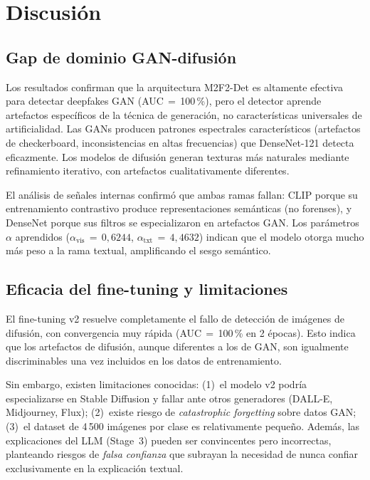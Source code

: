 \documentclass[pdflatex,sn-mathphys-num]{sn-jnl}
\begin{document}
\section{Discusión}\label{sec:discussion}

\subsection{Gap de dominio GAN-difusión}

Los resultados confirman que la arquitectura M2F2-Det es altamente efectiva para detectar deepfakes GAN (AUC$\,=\,$100\,\%), pero el detector aprende artefactos específicos de la técnica de generación, no características universales de artificialidad. Las GANs producen patrones espectrales característicos (artefactos de checkerboard, inconsistencias en altas frecuencias) que DenseNet-121 detecta eficazmente. Los modelos de difusión generan texturas más naturales mediante refinamiento iterativo, con artefactos cualitativamente diferentes.

El análisis de señales internas confirmó que ambas ramas fallan: CLIP porque su entrenamiento contrastivo produce representaciones semánticas (no forenses), y DenseNet porque sus filtros se especializaron en artefactos GAN. Los parámetros $\alpha$ aprendidos ($\alpha_{\text{vis}}\,=\,0{,}6244$, $\alpha_{\text{txt}}\,=\,4{,}4632$) indican que el modelo otorga mucho más peso a la rama textual, amplificando el sesgo semántico.

\subsection{Eficacia del fine-tuning y limitaciones}

El fine-tuning v2 resuelve completamente el fallo de detección de imágenes de difusión, con convergencia muy rápida (AUC$\,=\,$100\,\% en 2 épocas). Esto indica que los artefactos de difusión, aunque diferentes a los de GAN, son igualmente discriminables una vez incluidos en los datos de entrenamiento.

Sin embargo, existen limitaciones conocidas: (1)~el modelo v2 podría especializarse en Stable Diffusion y fallar ante otros generadores (DALL-E, Midjourney, Flux); (2)~existe riesgo de \emph{catastrophic forgetting} sobre datos GAN; (3)~el dataset de 4\,500 imágenes por clase es relativamente pequeño. Además, las explicaciones del LLM (Stage~3) pueden ser convincentes pero incorrectas, planteando riesgos de \emph{falsa confianza} que subrayan la necesidad de nunca confiar exclusivamente en la explicación textual.
\end{document}
